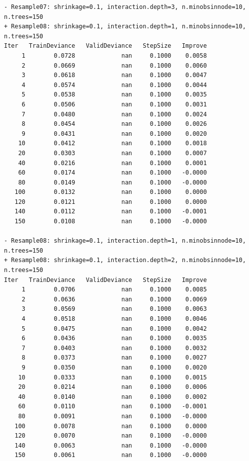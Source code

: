 \documentclass[
  letterpaper,
  DIV=11,
  numbers=noendperiod]{scrartcl}
\begin{document}
\begin{verbatim}
- Resample07: shrinkage=0.1, interaction.depth=3, n.minobsinnode=10, n.trees=150 
+ Resample08: shrinkage=0.1, interaction.depth=1, n.minobsinnode=10, n.trees=150 
Iter   TrainDeviance   ValidDeviance   StepSize   Improve
     1        0.0728             nan     0.1000    0.0058
     2        0.0669             nan     0.1000    0.0060
     3        0.0618             nan     0.1000    0.0047
     4        0.0574             nan     0.1000    0.0044
     5        0.0538             nan     0.1000    0.0035
     6        0.0506             nan     0.1000    0.0031
     7        0.0480             nan     0.1000    0.0024
     8        0.0454             nan     0.1000    0.0026
     9        0.0431             nan     0.1000    0.0020
    10        0.0412             nan     0.1000    0.0018
    20        0.0303             nan     0.1000    0.0007
    40        0.0216             nan     0.1000    0.0001
    60        0.0174             nan     0.1000   -0.0000
    80        0.0149             nan     0.1000   -0.0000
   100        0.0132             nan     0.1000    0.0000
   120        0.0121             nan     0.1000    0.0000
   140        0.0112             nan     0.1000   -0.0001
   150        0.0108             nan     0.1000   -0.0000

- Resample08: shrinkage=0.1, interaction.depth=1, n.minobsinnode=10, n.trees=150 
+ Resample08: shrinkage=0.1, interaction.depth=2, n.minobsinnode=10, n.trees=150 
Iter   TrainDeviance   ValidDeviance   StepSize   Improve
     1        0.0706             nan     0.1000    0.0085
     2        0.0636             nan     0.1000    0.0069
     3        0.0569             nan     0.1000    0.0063
     4        0.0518             nan     0.1000    0.0046
     5        0.0475             nan     0.1000    0.0042
     6        0.0436             nan     0.1000    0.0035
     7        0.0403             nan     0.1000    0.0032
     8        0.0373             nan     0.1000    0.0027
     9        0.0350             nan     0.1000    0.0020
    10        0.0333             nan     0.1000    0.0015
    20        0.0214             nan     0.1000    0.0006
    40        0.0140             nan     0.1000    0.0002
    60        0.0110             nan     0.1000   -0.0001
    80        0.0091             nan     0.1000   -0.0000
   100        0.0078             nan     0.1000    0.0000
   120        0.0070             nan     0.1000   -0.0000
   140        0.0063             nan     0.1000   -0.0000
   150        0.0061             nan     0.1000   -0.0000


\end{verbatim}
\end{document}
